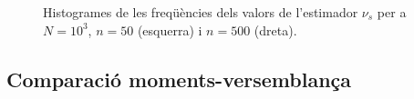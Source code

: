 \documentclass[12pt, catalan]{article}
\numberwithin{table}{section}
\numberwithin{figure}{section}
\numberwithin{equation}{section}
\begin{document}
\begin{figure}[!ht]
     \hfill
     \caption{Histogrames de les freqüències dels valors de l'estimador $\nu_s$ per a $N=10^3$, $n=50$ (esquerra) i $n=500$ (dreta).}
     \label{compararvers}
  \end{figure}

\subsection{Comparació moments-versemblança}
\end{document}
